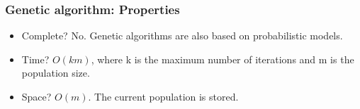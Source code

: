 \documentclass{beamer}
\begin{document}
    \begin{frame}
    \frametitle{Genetic algorithm: Properties}
     \begin{itemize}
         \item Complete? \pause No.
         \pause         
         Genetic algorithms are also based on probabilistic models.
         \pause
         \item Time? \pause 
         \begin{math}O(km)\end{math}, where k is the maximum number of iterations and m is the population size.
         \pause
         \item Space? \pause
         \begin{math}O(m).\end{math} 
         \pause
         The current population is stored.
     \end{itemize}   
    \end{frame}
\end{document}
